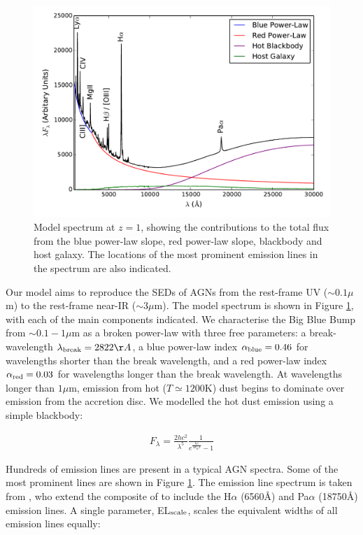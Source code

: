 \begin{figure}
  \centering
  \includegraphics[width=\columnwidth]{figures/chapter06/modelsed}
  \caption{Model spectrum at $z=1$, showing the contributions to the total flux from the blue power-law slope, red power-law slope, blackbody and host galaxy. The locations of the most prominent emission lines in the spectrum are also indicated. }
  \label{fig:modelsed}
\end{figure}

Our model aims to reproduce the SEDs of AGNs from the rest-frame UV ($\sim 0.1 \mu$m) to the rest-frame near-IR ($\sim 3 \mu$m). The model spectrum is shown in Figure \ref{fig:modelsed}, with each of the main components indicated. We characterise the Big Blue Bump from $\sim 0.1 - 1 \mu$m as a broken power-law with three free parameters: a break-wavelength $\lambda_{\rm break} = 2822\AA$, a blue power-law index $\alpha_{\rm blue} = 0.46$ for wavelengths shorter than the break wavelength, and a red power-law index $\alpha_{\rm red} = 0.03$ for wavelengths longer than the break wavelength. At wavelengths longer than $1\mu$m, emission from hot ($T \simeq 1200$K) dust begins to dominate over emission from the accretion disc. We modelled the hot dust emission using a simple blackbody:

\begin{eqnarray}  
  F_\lambda =\frac{2 hc^2}{\lambda^5}\frac{1}{ e^{\frac{hc}{\lambda k_\mathrm{B}T}} - 1} 
\end{eqnarray}

Hundreds of emission lines are present in a typical AGN spectra. Some of the most prominent lines are shown in Figure \ref{fig:modelsed}. The emission line spectrum is taken from \citet{maddox06}, who extend the composite of \citet{francis91} to include the H$\alpha$ (6560\AA) and Pa$\alpha$ (18750\AA) emission lines. A single parameter, EL$_{\rm scale}$, scales the equivalent widths of all emission lines equally:

